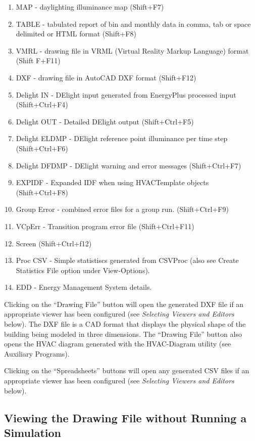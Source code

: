 \begin{enumerate}
\item
  MAP - daylighting illuminance map (Shift+F7)
\item
  TABLE - tabulated report of bin and monthly data in comma, tab or space delimited or HTML format (Shift+F8)
\item
  VMRL - drawing file in VRML (Virtual Reality Markup Language) format (Shift F+F11)
\item
  DXF - drawing file in AutoCAD DXF format (Shift+F12)
\item
  Delight IN - DElight input generated from EnergyPlus processed input (Shift+Ctrl+F4)
\item
  Delight OUT - Detailed DElight output (Shift+Ctrl+F5)
\item
  Delight ELDMP - DElight reference point illuminance per time step (Shift+Ctrl+F6)
\item
  Delight DFDMP - DElight warning and error messages (Shift+Ctrl+F7)
\item
  EXPIDF - Expanded IDF when using HVACTemplate objects (Shift+Ctrl+F8)
\item
  Group Error - combined error files for a group run. (Shift+Ctrl+F9)
\item
  VCpErr - Transition program error file (Shift+Ctrl+F11)
\item
  Screen (Shift+Ctrl+f12)
\item
  Proc CSV - Simple statistiscs generated from CSVProc (also see Create Statistics File option under View-Options).
\item
  EDD - Energy Management System details.
\end{enumerate}

Clicking on the ``Drawing File'' button will open the generated DXF file if an appropriate viewer has been configured (see \emph{Selecting Viewers and Editors} below). The DXF file is a CAD format that displays the physical shape of the building being modeled in three dimensions. The ``Drawing File'' button also opens the HVAC diagram generated with the HVAC-Diagram utility (see Auxiliary Programs).

Clicking on the ``Spreadsheets'' buttons will open any generated CSV files if an appropriate viewer has been configured (see \emph{Selecting Viewers and Editors} below).

\subsection{Viewing the Drawing File without Running a Simulation}\label{viewing-the-drawing-file-without-running-a-simulation}

